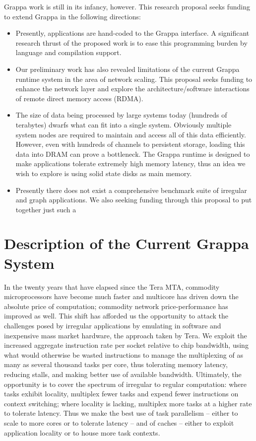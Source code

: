 Grappa work is still in its infancy, however.  This research proposal seeks funding to extend Grappa in the following directions:

\begin{itemize}
\item Presently, applications are hand-coded to the Grappa interface.  A significant research thrust of the proposed work is to ease this programming burden by language and compilation support.

\item Our preliminary work has also revealed limitations of the current Grappa runtime system in the area of network scaling.  This proposal seeks funding to enhance the network layer and explore the architecture/software interactions of remote direct memory access (RDMA).

\item The size of data being processed by large systems today (hundreds of terabytes) dwarfs what can fit into a single system. Obviously multiple system nodes are required to maintain and access all of this data efficiently.  However, even with hundreds of channels to persistent storage, loading this data into DRAM can prove a bottleneck.  The Grappa runtime is designed to make applications tolerate extremely high memory latency, thus an idea we wish to explore is using solid state disks as main memory. 

\item Presently there does not exist a comprehensive benchmark suite of irregular and graph applications.  We also seeking funding through this proposal to put together just such a 

\end{itemize}


\section{Description of the Current Grappa System}

In the twenty years that have elapsed since the Tera MTA, commodity microprocessors have become much faster and multicore has driven down the absolute price of computation; commodity network price-performance has improved as well. This shift has afforded us the opportunity to attack the challenges posed by irregular applications by emulating in software and inexpensive mass market hardware, the approach taken by Tera. We exploit the increased aggregate instruction rate per socket relative to chip bandwidth, using what would otherwise be wasted instructions to manage the multiplexing of as many as several thousand tasks per core, thus tolerating memory latency, reducing stalls, and making better use of available bandwidth. Ultimately, the opportunity is to cover the spectrum of irregular to regular computation: where tasks exhibit locality, multiplex fewer tasks and expend fewer instructions on context switching; where locality is lacking, multiplex more tasks at a higher rate to tolerate latency. Thus we make the best use of task parallelism -- either to scale to more cores or to tolerate latency -- and of caches -- either to exploit application locality or to house more task contexts.

